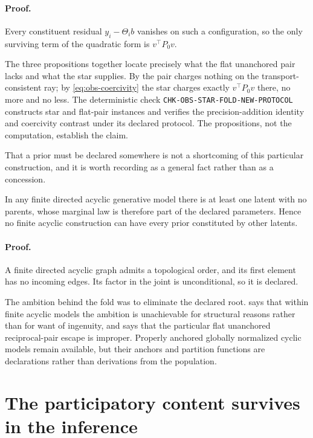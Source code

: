 \paragraph{Proof.}
Every constituent residual $y_i-\Theta_ib$ vanishes on such a configuration, so the only surviving term of the quadratic form is $v^{\top}P_0v$.

The three propositions together locate precisely what the flat unanchored pair lacks and what the star supplies. By  the pair charges nothing on the transport-consistent ray; by \eqref{eq:obs-coercivity} the star charges exactly $v^{\top}P_0v$ there, no more and no less. The deterministic check \texttt{CHK-OBS-STAR-FOLD-NEW-PROTOCOL} constructs star and flat-pair instances and verifies the precision-addition identity and coercivity contrast under its declared protocol. The propositions, not the computation, establish the claim. 

That a prior must be declared somewhere is not a shortcoming of this particular construction, and it is worth recording as a general fact rather than as a concession.

In any finite directed acyclic generative model there is at least one latent with no parents, whose marginal law is therefore part of the declared parameters. Hence no finite acyclic construction can have every prior constituted by other latents.

\paragraph{Proof.}
A finite directed acyclic graph admits a topological order, and its first element has no incoming edges. Its factor in the joint is unconditional, so it is declared.

The ambition behind the fold was to eliminate the declared root.  says that within finite acyclic models the ambition is unachievable for structural reasons rather than for want of ingenuity, and  says that the particular flat unanchored reciprocal-pair escape is improper. Properly anchored globally normalized cyclic models remain available, but their anchors and partition functions are declarations rather than derivations from the population.

\section{The participatory content survives in the inference}
\label{sec:obs-participatory}

